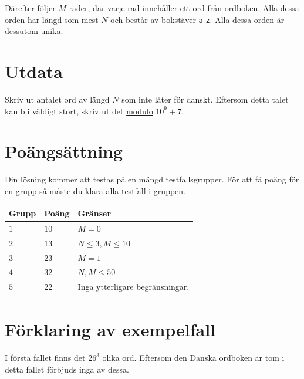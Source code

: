 Därefter följer $M$ rader, där varje rad innehåller ett ord från ordboken. Alla dessa orden har längd som mest $N$
och består av bokstäver \texttt{a}-\texttt{z}. Alla dessa orden är dessutom unika.


\section*{Utdata}
Skriv ut antalet ord av längd $N$ som inte låter för danskt. Eftersom detta talet kan bli väldigt stort,
skriv ut det \href{https://en.wikipedia.org/wiki/Modulo}{modulo} $10^9+7$. 

\section*{Poängsättning}
Din lösning kommer att testas på en mängd testfallsgrupper.
För att få poäng för en grupp så måste du klara alla testfall i gruppen.

\noindent
\begin{tabular}{| l | l | p{12cm} |}
  \hline
  \textbf{Grupp} & \textbf{Poäng} & \textbf{Gränser} \\ \hline
  $1$    & $10$       & $M = 0$ \\ \hline
  $2$    & $13$       & $N \leq 3, M \leq 10$ \\ \hline
  $3$    & $23$       & $M = 1$ \\ \hline
  $4$    & $32$       & $N, M \leq 50$ \\ \hline
  $5$    & $22$       & Inga ytterligare begränsningar. \\ \hline
\end{tabular}

\section*{Förklaring av exempelfall}
I första fallet finns det $26^3$ olika ord. Eftersom den Danska ordboken är tom i detta fallet förbjuds inga av dessa.

